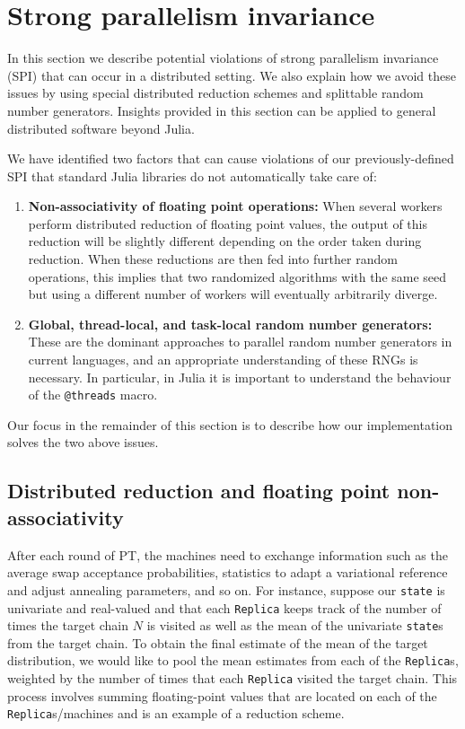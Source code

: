 \section{Strong parallelism invariance}
\label{sec:PI_causes}
In this section we describe potential violations of 
strong parallelism invariance (SPI) that can occur in a distributed setting. 
We also explain how we avoid these issues by using special 
distributed reduction schemes and splittable random number generators. 
Insights provided in this section can be applied 
to general distributed software beyond Julia.

 
We have identified two factors that can cause violations of our previously-defined 
SPI that standard Julia libraries 
do not automatically take care of:
\begin{enumerate}   
  \item \textbf{Non-associativity of floating point operations:} When 
  several workers perform distributed reduction of floating point values, 
  the output of this reduction will be slightly different depending on the order taken 
  during reduction. 
  When these reductions are then fed into further random operations, 
  this implies that two randomized algorithms with the same seed but using a 
  different number of workers will eventually arbitrarily diverge.

  \item \textbf{Global, thread-local, and task-local random number generators:} 
  These are the dominant approaches to parallel random number generators in current languages, 
  and an appropriate understanding of these RNGs is necessary. In particular, 
  in Julia it is important to understand the behaviour of the \texttt{@threads} macro.
\end{enumerate}
Our focus in the remainder of this section is to describe how our implementation 
solves the two above issues.


\subsection{Distributed reduction and floating point non-associativity}
After each round of PT, the machines need to exchange information such as the 
average swap acceptance probabilities, statistics to adapt a variational 
reference and adjust annealing parameters, and so on. 
For instance, suppose our \texttt{state} is univariate and real-valued and 
that each \texttt{Replica} keeps track of the number of times the target chain $N$ 
is visited as well as the mean of the univariate \texttt{state}s from the target chain.
To obtain the final estimate of the mean of the target distribution, we would like 
to pool the mean estimates from each of the \texttt{Replica}s, weighted by 
the number of times that each \texttt{Replica} visited the target chain.   
This process involves summing floating-point values that are located on each 
of the \texttt{Replica}s/machines and is an example of a reduction scheme.

